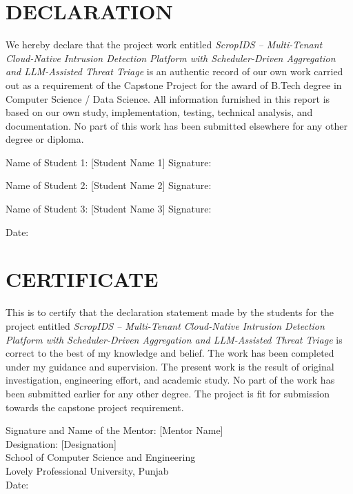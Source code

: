 \documentclass[12pt,a4paper]{article}
\begin{document}
\clearpage
\section*{DECLARATION}
We hereby declare that the project work entitled \textit{ScropIDS -- Multi-Tenant Cloud-Native Intrusion Detection Platform with Scheduler-Driven Aggregation and LLM-Assisted Threat Triage} is an authentic record of our own work carried out as a requirement of the Capstone Project for the award of B.Tech degree in Computer Science / Data Science. All information furnished in this report is based on our own study, implementation, testing, technical analysis, and documentation. No part of this work has been submitted elsewhere for any other degree or diploma.

\vspace{0.8cm}
Name of Student 1: [Student Name 1] \hspace{0.4cm} Signature: \hrulefill

\vspace{0.5cm}
Name of Student 2: [Student Name 2] \hspace{0.4cm} Signature: \hrulefill

\vspace{0.5cm}
Name of Student 3: [Student Name 3] \hspace{0.4cm} Signature: \hrulefill

\vspace{0.5cm}
Date: \hrulefill

\clearpage
\section*{CERTIFICATE}
This is to certify that the declaration statement made by the students for the project entitled \textit{ScropIDS -- Multi-Tenant Cloud-Native Intrusion Detection Platform with Scheduler-Driven Aggregation and LLM-Assisted Threat Triage} is correct to the best of my knowledge and belief. The work has been completed under my guidance and supervision. The present work is the result of original investigation, engineering effort, and academic study. No part of the work has been submitted earlier for any other degree. The project is fit for submission towards the capstone project requirement.

\vspace{1cm}
Signature and Name of the Mentor: [Mentor Name]\\
Designation: [Designation]\\
School of Computer Science and Engineering\\
Lovely Professional University, Punjab\\
Date: \hrulefill
\end{document}
